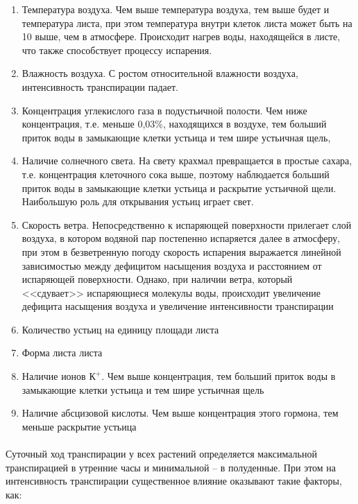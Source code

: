 \begin{enumerate}
	\item Температура воздуха. Чем выше температура воздуха, тем выше будет и температура листа, при этом температура внутри клеток листа может быть на 10 \celsius выше, чем в атмосфере. Происходит нагрев воды, находящейся в листе, что также способствует процессу испарения.
	\item Влажность воздуха. С ростом относительной влажности воздуха, интенсивность транспирации падает.
	\item Концентрация углекислого газа в подустьичной полости. Чем ниже концентрация, т.е. меньше 0,03\%, находящихся в воздухе, тем больший приток воды в замыкающие клетки устьица и тем шире устьичная щель,
	\item Наличие солнечного света. На свету крахмал превращается в простые сахара, т.е. концентрация клеточного сока выше, поэтому наблюдается больший приток воды в замыкающие клетки устьица и раскрытие устьичной щели. Наибольшую роль для открывания устьиц играет  свет.
	\item Скорость ветра. Непосредственно к испаряющей поверхности прилегает слой воздуха, в котором водяной пар постепенно испаряется далее в атмосферу, при этом в безветренную погоду скорость испарения выражается линейной зависимостью между дефицитом насыщения воздуха и расстоянием от испаряющей поверхности. Однако, при наличии ветра, который <<сдувает>> испаряющиеся молекулы воды, происходит увеличение дефицита насыщения воздуха и увеличение интенсивности транспирации
	\item Количество устьиц на единицу площади листа
	\item Форма листа листа
	\item Наличие ионов $К^{+}$. Чем выше концентрация, тем больший приток воды в замыкающие клетки устьица и тем шире устьичная щель
	\item Наличие абсцизовой кислоты. Чем выше концентрация этого гормона, тем меньше раскрытие устьица 
\end{enumerate}

\paragraph*{}Суточный ход транспирации у всех растений определяется максимальной транспирацией в утренние часы и минимальной -- в полуденные. При этом на интенсивность транспирации существенное влияние оказывают такие факторы, как:

